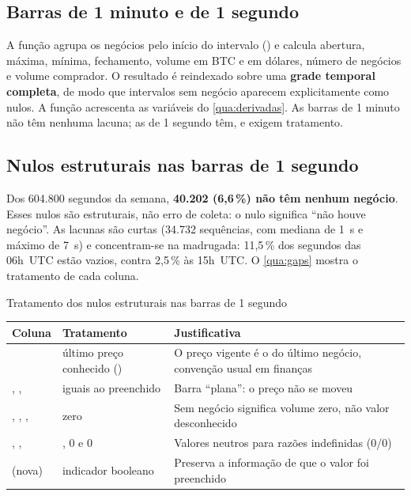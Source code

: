 \subsection{Barras de 1 minuto e de 1 segundo}\label{sec:barras}

A função  agrupa os negócios pelo início do intervalo
() e calcula abertura, máxima, mínima, fechamento,
volume em BTC e em dólares, número de negócios e volume comprador. O resultado é
reindexado sobre uma \textbf{grade temporal completa}, de modo que intervalos sem
negócio aparecem explicitamente como nulos. A função 
acrescenta as variáveis do \autoref{qua:derivadas}. As barras de 1 minuto não
têm nenhuma lacuna; as de 1 segundo têm, e exigem tratamento.

\subsection{Nulos estruturais nas barras de 1 segundo}\label{sec:gaps}

Dos 604.800 segundos da semana, \textbf{40.202 (6,6\,\%) não têm nenhum
negócio}. Esses nulos são estruturais, não erro de coleta: o nulo significa
``não houve negócio''. As lacunas são curtas (34.732 sequências, com mediana de
1~s e máximo de 7~s) e concentram-se na madrugada: 11,5\,\% dos segundos das
06h~UTC estão vazios, contra 2,5\,\% às 15h~UTC. O \autoref{qua:gaps} mostra o
tratamento de cada coluna.

\begin{quadro}[htbp]
\caption{\label{qua:gaps}Tratamento dos nulos estruturais nas barras de 1 segundo}
\begin{corpotabela}
\begin{tabularx}{\textwidth}{|L{4.0cm}|L{4.2cm}|Y|}
\hline
\textbf{Coluna} & \textbf{Tratamento} & \textbf{Justificativa} \\ \hline
{} & último preço conhecido () & O preço vigente é o do último negócio, convenção usual em finanças \\ \hline
{}, ,  & iguais ao  preenchido & Barra ``plana'': o preço não se moveu \\ \hline
{}, , ,  & zero & Sem negócio significa volume zero, não valor desconhecido \\ \hline
{}, ,  & , 0 e 0 & Valores neutros para razões indefinidas (0/0) \\ \hline
{} (nova) & indicador booleano & Preserva a informação de que o valor foi preenchido \\ \hline
\end{tabularx}
\end{corpotabela}
\fonteautores[Elaborado]
\end{quadro}


